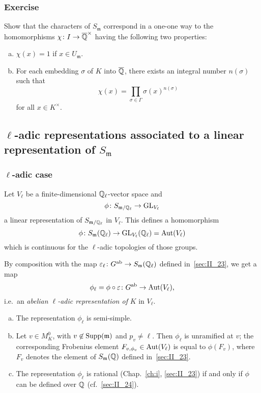 \subsubsection*{Exercise}
Show that the characters of $S_{\mathfrak{m}}$ correspond in a one-one way to
the homomorphisms $\chi \colon I \to \overline{\mathbb{Q}}^\times$ having the following
two properties:
\begin{enumerate}[(a)]
\item $\chi(x) = 1$ if $x \in U_{\mathfrak{m}}$.
\item For each embedding $\sigma$ of $K$ into $\overline{\mathbb{Q}}$, there exists an
	integral number $n(\sigma)$ such that
	\[
		\chi(x) = \prod_{\sigma \in \Gamma} \sigma(x)^{n(\sigma)}
	\]
	for all $x \in K^\times$.
\end{enumerate}

\subsection{\texorpdfstring{$\ell$}{ℓ}-adic representations associated to a
linear representation of \texorpdfstring{$S_{\mathfrak{m}}$}{Sm}}
\label{sec:II_25}
\dpage

\subsubsection{\texorpdfstring{$\ell$}{ℓ}-adic case}
\label{sec:II_25_1}

Let $V_\ell$ be a finite-dimensional $\mathbb{Q}_\ell$-vector space and
\[
	\phi \colon S_{\mathfrak{m} / \mathbb{Q}_\ell} \rightarrow \operatorname{GL}_{V_\ell}
\]
a linear representation of $S_{\mathfrak{m} / \mathbb{Q}_\ell}$ in $V_\ell$. This 
defines a homomorphism
\[
	\phi \colon S_\mathfrak{m}(\mathbb{Q}_\ell) \rightarrow \operatorname{GL}_{V_\ell}(\mathbb{Q}_\ell) = 
	\operatorname{Aut}(V_\ell)
\]
which is continuous for the $\ell$-adic topologies of those groups.

By composition with the map $\varepsilon_\ell \colon G^{\mathrm{ab}} \to
S_{\mathfrak{m}} (\mathbb{Q}_\ell)$ defined in~\ref{sec:II_23}, we get a map
\[
	\phi_\ell = \phi \circ \varepsilon \colon G^{\mathrm{ab}} \to \operatorname{Aut}(V_\ell),
\]
i.e.\ an \emph{abelian $\ell$-adic representation of} $K$ in $V_\ell$.

\begin{prop}
\begin{enumerate}[a), series=prII_25_1]
\item\label{prop:II_25_a}
	The representation $\phi_\ell$ is semi-simple.
\item\label{prop:II_25_b}
	Let $v \in M_K^0$, with $v \not\in \operatorname{Supp}(\mathfrak{m})$ and $p_v \neq 
	\ell$.
	Then $\phi_\ell$ is unramified at $v$; the corresponding Frobenius element 
	$F_{v, \phi_v} \in \operatorname{Aut}(V_\ell)$ is equal to $\phi(F_v)$, where $F_v$ denotes 
	the element of $S_\mathfrak{m}(\mathbb{Q})$ defined in~\ref{sec:II_23}.
	\dpage
\item\label{prop:II_25_c}
	The representation $\phi_\ell$ is rational (Chap.~\ref{ch:i},
	\ref{sec:II_23}) if and only if $\phi$ can be defined over $\mathbb{Q}$
	(cf.\ \ref{sec:II_24}).
\end{enumerate}
\end{prop}

